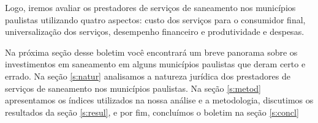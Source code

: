 \begin{multicols}{2}
Logo, iremos avaliar os prestadores de serviços de saneamento nos municípios paulistas utilizando quatro aspectos: custo dos serviços para o consumidor final, universalização dos serviços, desempenho financeiro e produtividade e despesas.

Na próxima seção desse boletim você encontrará um breve panorama sobre os investimentos em saneamento em alguns municípios paulistas que deram certo e errado. Na seção \ref{s:natur} analisamos a natureza jurídica dos prestadores de serviços de saneamento nos municípios paulistas. Na seção \ref{s:metod} apresentamos os índices utilizados na nossa análise e a metodologia, discutimos os resultados da seção \ref{s:resul}, e por fim, concluímos o boletim na seção \ref{s:concl}


\end{multicols}





  